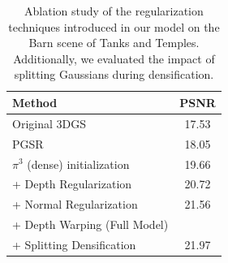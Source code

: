 \begin{table}[ht!]
    \centering
    \footnotesize
    \setlength{\tabcolsep}{2pt}
    \begin{tabular}{lc}
    \toprule
     Method & PSNR\\
     \midrule
 Original 3DGS & 17.53\\
 PGSR & 18.05\\
 $\pi^3$ (dense) initialization & 19.66\\
 + Depth Regularization & 20.72\\
 + Normal Regularization & \cellcolor{tab_color!10}21.56\\
 + Depth Warping (Full Model) & \cellcolor{tab_color!50}{22.15}\\
 \midrule
 + Splitting Densification &\cellcolor{tab_color!30}21.97\\
    \bottomrule
    \end{tabular}
    \caption{Ablation study of the regularization techniques introduced in our model on the Barn scene of Tanks and Temples. Additionally, we evaluated the impact of splitting Gaussians during densification.}
    \label{tab:ablation}
\end{table}